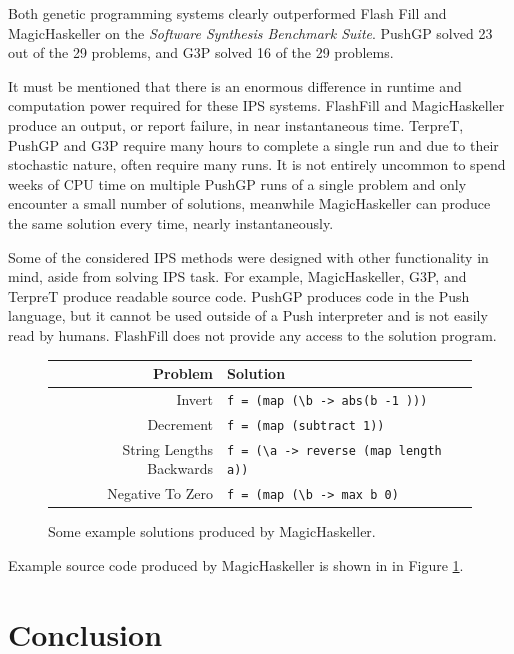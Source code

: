 Both genetic programming systems clearly outperformed Flash Fill and MagicHaskeller on the \emph{Software Synthesis Benchmark Suite}. PushGP solved  23 out of the 29 problems, and G3P solved 16 of the 29 problems.

It must be mentioned that there is an enormous difference in runtime and computation power required for these IPS systems. FlashFill and MagicHaskeller produce an output, or report failure, in near instantaneous time. TerpreT, PushGP  and G3P require many hours to complete a single run and due to their stochastic nature, often require many runs. It is not entirely uncommon to spend weeks of CPU time on multiple PushGP runs of a single problem and only encounter a small number of solutions, meanwhile MagicHaskeller can produce the same solution every time, nearly instantaneously. 

Some of the considered IPS methods were designed with other functionality in mind, aside from solving IPS task. For example, MagicHaskeller, G3P, and TerpreT produce readable source code. PushGP produces code in the Push language, but it cannot be used outside of a Push interpreter and is not easily read by humans. FlashFill does not provide any access to the solution program.

\begin{figure}
\begin{tabular}{ r | l }
\textbf{Problem} & \textbf{Solution} \\
\hline
Invert & \texttt{f = (map (\textbackslash b -> abs(b -1 )))} \\
Decrement & \texttt{f = (map (subtract 1))} \\ 
String Lengths Backwards & \texttt{f = (\textbackslash a -> reverse (map length a))} \\
Negative To Zero & \texttt{f = (map (\textbackslash b -> max b 0)} \\
\end{tabular}
\caption{Some example solutions produced by MagicHaskeller.}
\label{fig:MHsolutions}
\end{figure}

Example source code produced by MagicHaskeller is shown in in Figure \ref{fig:MHsolutions}.

\section{Conclusion}

